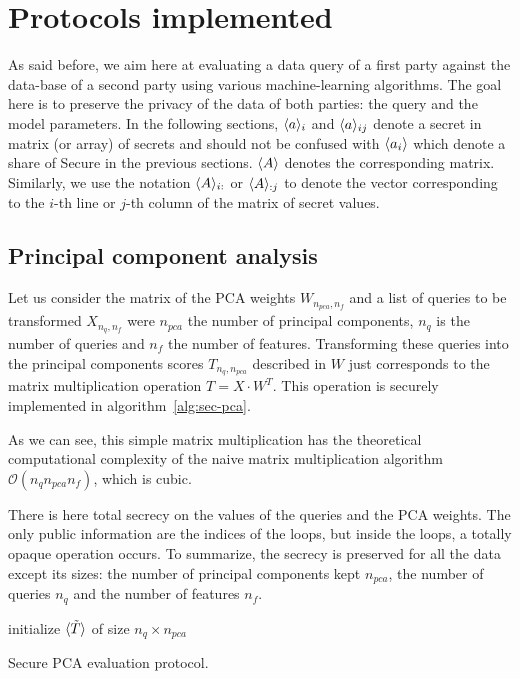 \section{Protocols implemented}
As said before, we aim here at evaluating a data query of a first party against the data-base of a second party using various machine-learning algorithms. The goal here is to preserve the privacy of the data of both parties: the query and the model parameters. In the following sections, $\langle a \rangle_i$ and $\langle a \rangle_{ij}$ denote a secret in matrix (or array) of secrets and should not be confused with $\langle a_i \rangle$ which denote a share of Secure in the previous sections. $\langle A \rangle$ denotes the corresponding matrix. Similarly, we use the notation $\langle A \rangle_{i:}$ or  $\langle A \rangle_{:j}$ to denote the vector corresponding to the $i$-th line or $j$-th column of the matrix of secret values.

\subsection{Principal component analysis}
Let us consider the matrix of the PCA weights $W_{n_{pca} , n_f}$ and a list of queries to be transformed $X_{n_q , n_f}$ were $n_{pca}$ the number of principal components, $n_q$ is the number of queries and $n_f$ the number of features. Transforming these queries into the principal components scores $T_{n_q , n_{pca}}$ described in $W$ just corresponds to the matrix multiplication operation $T=X \cdot W^T$. This operation is securely implemented in algorithm~\ref{alg:sec-pca}.

As we can see, this simple matrix multiplication has the theoretical computational complexity of the naive matrix multiplication algorithm $\mathcal{O}(n_q n_{pca} n_f)$, which is cubic.

There is here total secrecy on the values of the queries and the PCA weights. The only public information are the indices of the loops, but inside the loops, a totally opaque operation occurs. To summarize, the secrecy is preserved for all the data except its sizes: the number of principal components kept $n_{pca}$, the number of queries $n_q$ and the number of features $n_f$.

\begin{center}
\begin{algorithm}[H]
\DontPrintSemicolon
initialize $\langle \tilde{T} \rangle$ of size $n_q \times n_{pca}$ \;
\caption{Secure PCA evaluation protocol.}
\label{alg:sec-pca}
\end{algorithm}
\end{center}

